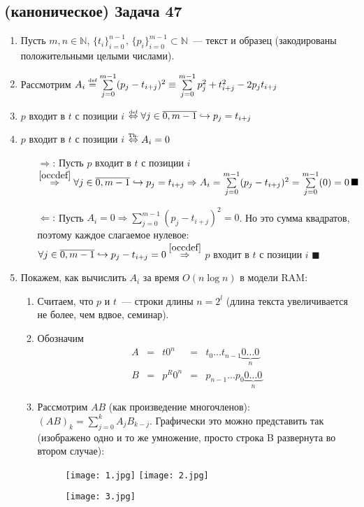 \documentclass[a4paper]{article}
\def\eqdef{\overset{\mbox{\tiny def}}{=}}
\newcommand{\NN}{\mathbb{N}}
\begin{document}
\subsection*{(каноническое) Задача 47}
\begin{enumerate}
\item Пусть $m,n\in\NN$, $\{t_i\}_{i=0}^{n-1},\,\{p_i\}_{i=0}^{m-1}\subset \NN$~--- текст и образец (закодированы положительными целыми числами).
\item Рассмотрим $A_i\eqdef\sum\limits_{j=0}^{m-1}(p_j-t_{i+j})^2\equiv\sum\limits_{j=0}^{m-1}p_j^2+t_{i+j}^2-2p_jt_{i+j}$
\item \label{occdef} $p$ входит в $t$ с позиции $i$ $\overset{\mbox{\tiny def}}{\Leftrightarrow} \forall j\in\overline{0,m-1}\hookrightarrow p_j=t_{i+j}$
\item $p$ входит в $t$ с позиции $i$ $\overset{\mbox{\tiny Th.}}{\Leftrightarrow} A_i=0$\begin{enumerate}
\item [$\Rightarrow$:] Пусть $p$ входит в $t$ с позиции $i$ $\overset{\ref{occdef}}{\Rightarrow}\forall j\in\overline{0,m-1}\hookrightarrow p_j=t_{i+j}\Rightarrow A_i=\sum\limits_{j=0}^{m-1}(p_j-t_{i+j})^2=\sum\limits_{j=0}^{m-1}(0)=0\,\blacksquare$
\item [$\Leftarrow$:] Пусть $A_i=0\Rightarrow\sum\limits_{j=0}^{m-1}(p_j-t_{i+j})^2=0$. Но это сумма квадратов, поэтому каждое слагаемое нулевое: $\forall j\in\overline{0,m-1}\hookrightarrow p_j-t_{i+j}=0\overset{\ref{occdef}}{\Rightarrow}$ $p$ входит в $t$ с позиции $i$ $\blacksquare$
\end{enumerate}
\item Покажем, как вычислить $A_i$ за время $O(n\log n)$ в модели RAM:\begin{enumerate}
\item Считаем, что $p$ и $t$~--- строки длины $n=2^l$ (длина текста увеличивается не более, чем вдвое, семинар).
\item Обозначим$$\begin{array}{cclcl}
A&=&t0^n&=&t_0...t_{n-1}\underbrace{0...0}_n\\
B&=&p^R0^n&=&p_{n-1}...p_0\underbrace{0...0}_n
\end{array}$$
\item Рассмотрим $AB$ (как произведение многочленов): $(AB)_k=\sum\limits_{j=0}^kA_jB_{k-j}$. Графически это можно представить так (изображено одно и то же умножение, просто строка B развернута во втором случае):
\begin{figure}[hr]
	\texttt{[image: 1.jpg]}
	\texttt{[image: 2.jpg]}
\end{figure}\newline
\begin{figure}[hr]
	\texttt{[image: 3.jpg]}
\end{figure}\newline
\end{enumerate}
\end{enumerate}
\end{document}
